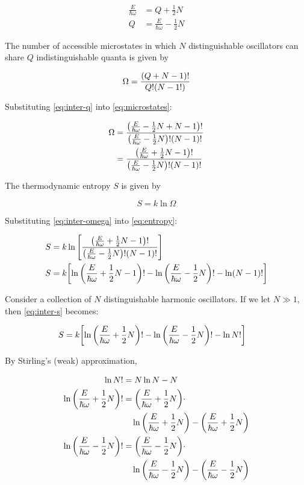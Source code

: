 \documentclass[9pt,a4paper,twocolumn]{article}
\begin{document}
\begin{align}
	\frac{E}{\hbar\omega} &= Q + \frac{1}{2}N \\
	Q &= \frac{E}{\hbar\omega} - \frac{1}{2}N \label{eq:inter-q}
\end{align}

The number of accessible microstates in which $N$ distinguishable oscillators can share $Q$ indistinguishable quanta is given by

\begin{equation}
	\Omega = \frac{\qty(Q+N-1)!}{Q!\qty(N-1!)} \label{eq:microstates}
\end{equation}

Substituting \eqref{eq:inter-q} into \eqref{eq:microstates}:

\begin{align}
	\Omega &= \frac{\qty(\frac{E}{\hbar\omega} - \frac{1}{2}N + N - 1)!}{\qty(\frac{E}{\hbar\omega} - \frac{1}{2}N)! \qty(N-1)!} \\
	&= \frac{\qty(\frac{E}{\hbar\omega} + \frac{1}{2}N -1)!}{\qty(\frac{E}{\hbar\omega} - \frac{1}{2}N)!(N-1)!} \label{eq:inter-omega}
\end{align}

The thermodynamic entropy $S$ is given by

\begin{equation}
	S = k\ln\Omega \label{eq:entropy}
\end{equation}

Substituting \eqref{eq:inter-omega} into \eqref{eq:entropy}:

\begin{align}
	S &= k\ln\qty[\frac{\qty(\frac{E}{\hbar\omega} + \frac{1}{2}N -1)!}{\qty(\frac{E}{\hbar\omega} - \frac{1}{2}N)!(N-1)!}]\\
    S &= k\qty[\ln\qty(\frac{E}{\hbar\omega} + \frac{1}{2}N -1)!-\ln\qty(\frac{E}{\hbar\omega} - \frac{1}{2}N)! - \ln(N-1)!] \label{eq:inter-s}
\end{align}

Consider a collection of $N$ distinguishable harmonic oscillators. If we let $N \gg 1$, then \eqref{eq:inter-s} becomes:

\begin{align}
	S &= k\qty[\ln\qty(\frac{E}{\hbar\omega} + \frac{1}{2}N)!-\ln\qty(\frac{E}{\hbar\omega} - \frac{1}{2}N)! - \ln N!]
\end{align}

By Stirling's (weak) approximation,

\begin{align}
    \ln N! &= N\ln N - N\\
    \ln\qty(\frac{E}{\hbar\omega} + \frac{1}{2}N)! &= \qty(\frac{E}{\hbar\omega} + \frac{1}{2}N) \cdot \nonumber \\
    &\quad \ln\qty(\frac{E}{\hbar\omega} + \frac{1}{2}N) - \qty(\frac{E}{\hbar\omega} + \frac{1}{2}N) \\
    \ln\qty(\frac{E}{\hbar\omega} - \frac{1}{2}N)! &= \qty(\frac{E}{\hbar\omega} - \frac{1}{2}N) \cdot \nonumber \\
    &\quad \ln\qty(\frac{E}{\hbar\omega} - \frac{1}{2}N) - \qty(\frac{E}{\hbar\omega} - \frac{1}{2}N)
\end{align}
\end{document}
